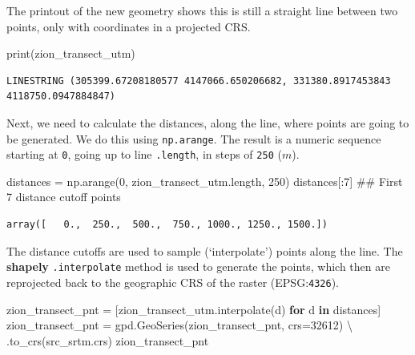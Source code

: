 \documentclass[
  letterpaper,
]{krantz}
\newenvironment{Shaded}{\begin{snugshade}}{\end{snugshade}}
\newcommand{\BuiltInTok}[1]{\textcolor[rgb]{0.00,0.23,0.31}{#1}}
\newcommand{\CommentTok}[1]{\textcolor[rgb]{0.37,0.37,0.37}{#1}}
\newcommand{\ControlFlowTok}[1]{\textcolor[rgb]{0.00,0.23,0.31}{\textbf{#1}}}
\newcommand{\DecValTok}[1]{\textcolor[rgb]{0.68,0.00,0.00}{#1}}
\newcommand{\KeywordTok}[1]{\textcolor[rgb]{0.00,0.23,0.31}{\textbf{#1}}}
\newcommand{\NormalTok}[1]{\textcolor[rgb]{0.00,0.23,0.31}{#1}}
\newcommand{\OperatorTok}[1]{\textcolor[rgb]{0.37,0.37,0.37}{#1}}
\begin{document}
The printout of the new geometry shows this is still a straight line
between two points, only with coordinates in a projected CRS.

\begin{Shaded}
\begin{Highlighting}[]
\BuiltInTok{print}\NormalTok{(zion\_transect\_utm)}
\end{Highlighting}
\end{Shaded}

\begin{verbatim}
LINESTRING (305399.67208180577 4147066.650206682, 331380.8917453843 4118750.0947884847)
\end{verbatim}

Next, we need to calculate the distances, along the line, where points
are going to be generated. We do this using \texttt{np.arange}. The
result is a numeric sequence starting at \texttt{0}, going up to line
\texttt{.length}, in steps of \texttt{250} (\(m\)).

\begin{Shaded}
\begin{Highlighting}[]
\NormalTok{distances }\OperatorTok{=}\NormalTok{ np.arange(}\DecValTok{0}\NormalTok{, zion\_transect\_utm.length, }\DecValTok{250}\NormalTok{)}
\NormalTok{distances[:}\DecValTok{7}\NormalTok{]  }\CommentTok{\#\# First 7 distance cutoff points}
\end{Highlighting}
\end{Shaded}

\begin{verbatim}
array([   0.,  250.,  500.,  750., 1000., 1250., 1500.])
\end{verbatim}

The distance cutoffs are used to sample (`interpolate') points along the
line. The \textbf{shapely} \texttt{.interpolate} method is used to
generate the points, which then are reprojected back to the geographic
CRS of the raster (EPSG:\texttt{4326}).

\begin{Shaded}
\begin{Highlighting}[]
\NormalTok{zion\_transect\_pnt }\OperatorTok{=}\NormalTok{ [zion\_transect\_utm.interpolate(d) }\ControlFlowTok{for}\NormalTok{ d }\KeywordTok{in}\NormalTok{ distances]}
\NormalTok{zion\_transect\_pnt }\OperatorTok{=}\NormalTok{ gpd.GeoSeries(zion\_transect\_pnt, crs}\OperatorTok{=}\DecValTok{32612}\NormalTok{) }\OperatorTok{\textbackslash{}}
\NormalTok{    .to\_crs(src\_srtm.crs)}
\NormalTok{zion\_transect\_pnt}
\end{Highlighting}
\end{Shaded}
\end{document}
